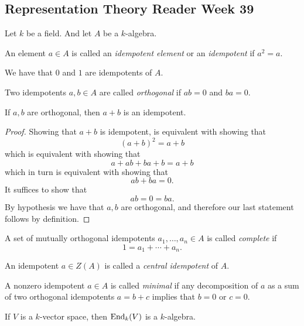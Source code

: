 \subsection{Representation Theory Reader Week 39}

Let \(k\) be a field. And let \(A\) be a \(k\)-algebra.

\begin{defn}
An element \(a\in A\) is called an \emph{idempotent element} or an \emph{idempotent} if \(a^2=a.\)
\end{defn}

\begin{prop}
We have that \(0\) and \(1\) are idempotents of \(A\).
\end{prop}

\begin{defn}
Two idempotents \(a,b\in A\) are called \emph{orthogonal} if \(ab=0\) and \(ba=0\).
\end{defn}

\begin{prop}
If \(a,b\) are orthogonal, then \(a+b\) is an idempotent.
\end{prop}

\begin{proof}
Showing that \(a+b\) is idempotent, is equivalent with showing that
\[
(a+b)^2=a+b
\]
which is equivalent with showing that
\[
a+ab+ba+b=a+b
\]
which in turn is equivalent with showing that
\[
ab+ba=0.
\]
It suffices to show that
\[
ab=0=ba.
\]
By hypothesis we have that $a,b$ are orthogonal, and therefore our last statement follows by definition.
\end{proof}

\begin{defn}
A set of mutually orthogonal idempotents \(a_{1},\ldots ,a_{n}\in A\) is called \emph{complete} if
\[
1=a_{1}+\cdots +a_{n}.
\]
\end{defn}

\begin{defn}
An idempotent \(a\in Z(A)\) is called a \emph{central idempotent} of \(A\).
\end{defn}

\begin{defn}
A nonzero idempotent \(a\in A\) is called \emph{minimal} if any decomposition of \(a\) as a sum of two orthogonal idempotents \(a=b+c\) implies that \(b=0\) or \(c=0\).
\end{defn}

\begin{prop}
If \(V\) is a \(k\)-vector space, then \(\operatorname{End}_{k}(V)\) is a \(k\)-algebra.
\end{prop}

